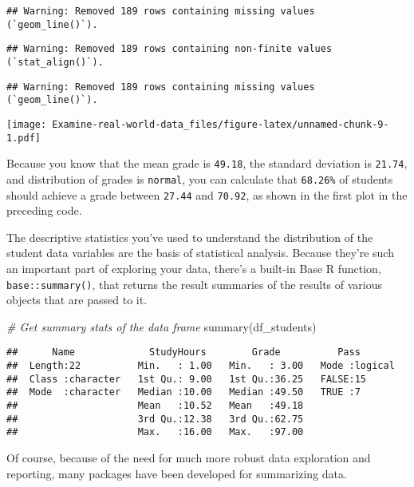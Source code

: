\documentclass[
]{article}
\newenvironment{Shaded}{\begin{snugshade}}{\end{snugshade}}
\newcommand{\CommentTok}[1]{\textcolor[rgb]{0.56,0.35,0.01}{\textit{#1}}}
\newcommand{\FunctionTok}[1]{\textcolor[rgb]{0.00,0.00,0.00}{#1}}
\newcommand{\NormalTok}[1]{#1}
\begin{document}
\begin{verbatim}
## Warning: Removed 189 rows containing missing values (`geom_line()`).
\end{verbatim}

\begin{verbatim}
## Warning: Removed 189 rows containing non-finite values (`stat_align()`).
\end{verbatim}

\begin{verbatim}
## Warning: Removed 189 rows containing missing values (`geom_line()`).
\end{verbatim}

\texttt{[image: Examine-real-world-data\_files/figure-latex/unnamed-chunk-9-1.pdf]}

Because you know that the mean grade is \texttt{49.18}, the standard
deviation is \texttt{21.74}, and distribution of grades is
\texttt{normal}, you can calculate that \texttt{68.26\%} of students
should achieve a grade between \texttt{27.44} and \texttt{70.92}, as
shown in the first plot in the preceding code.

The descriptive statistics you've used to understand the distribution of
the student data variables are the basis of statistical analysis.
Because they're such an important part of exploring your data, there's a
built-in Base R function, \texttt{base::summary()}, that returns the
result summaries of the results of various objects that are passed to
it.

\begin{Shaded}
\begin{Highlighting}[]
\CommentTok{\# Get summary stats of the data frame}
\FunctionTok{summary}\NormalTok{(df\_students)}
\end{Highlighting}
\end{Shaded}

\begin{verbatim}
##      Name             StudyHours        Grade          Pass        
##  Length:22          Min.   : 1.00   Min.   : 3.00   Mode :logical  
##  Class :character   1st Qu.: 9.00   1st Qu.:36.25   FALSE:15       
##  Mode  :character   Median :10.00   Median :49.50   TRUE :7        
##                     Mean   :10.52   Mean   :49.18                  
##                     3rd Qu.:12.38   3rd Qu.:62.75                  
##                     Max.   :16.00   Max.   :97.00
\end{verbatim}

Of course, because of the need for much more robust data exploration and
reporting, many packages have been developed for summarizing data.
\end{document}
